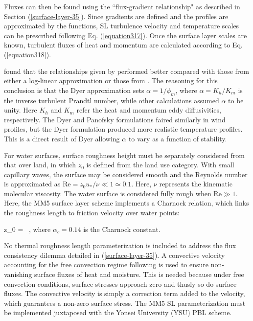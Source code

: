 Fluxes can then be found using the ``flux-gradient relationship" as described in Section (\autoref{surface-layer-35}). Since gradients are defined and the profiles are approximated by the  \citet{Dyer} functions, SL turbulence velocity and temperature scales can be prescribed following Eq. (\autoref{equation317}). Once the surface layer scales are known, turbulent fluxes of heat and momentum are calculated according to Eq. (\autoref{equation318}).

 \citet{Paulson} found that the relationships given by  \citet{Dyer} performed better compared with those from either a log-linear approximation or those from  \citet{Pan63}. The reasoning for this conclusion is that the Dyer approximation sets $\alpha = 1/\phi_m$, where $\alpha = K_h/K_m$ is the inverse turbulent Prandtl number, while other calculations assumed $\alpha$ to be unity. Here $K_h$ and $K_m$ refer the heat and momentum eddy diffusivities, respectively. The Dyer and Panofsky formulations faired similarly in wind profiles, but the Dyer formulation produced more realistic temperature profiles. This is a direct result of Dyer allowing $\alpha$ to vary as a function of stability.

For water surfaces, surface roughness height must be separately considered from that over land, in which $z_0$ is defined from the land use category. With small capillary waves, the surface may be considered smooth and the Reynolds number is approximated as $\mathrm{Re} = z_0 u_*/\nu \ll 1 \simeq 0.1 $. Here, $\nu$ represents the kinematic molecular viscosity. The water surface is considered fully rough when $\mathrm{Re} \gg 1$. Here, the MM5 surface layer scheme implements a Charnock relation, which links the roughness length to friction velocity over water points:

\be
z_0 =  \mbox{ ,} \label{equation323}
\ee
\noindent
 where $\alpha_c = 0.14$ is the Charnock constant.

No thermal roughness length parameterization is included to address the flux consistency dilemma detailed in (\autoref{surface-layer-35}). A convective velocity accounting for the free convection regime following  \citet{Beljaars} is used to ensure non-vanishing surface fluxes of heat and moisture. This is needed because under free convection conditions, surface stresses approach zero and thusly so do surface fluxes. The convective velocity is simply a correction term added to the velocity, which guarantees a non-zero surface stress. The MM5 SL parameterization must be implemented juxtaposed with the Yonsei University (YSU) PBL scheme.

